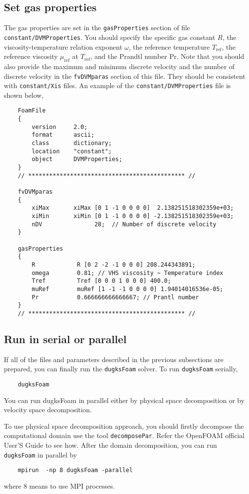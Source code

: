 \subsection{Set gas properties}
The gas properties are set in the \verb|gasProperties| section of file \verb|constant/DVMProperties|.
You should specify the specific gas constant $R$, the viscosity-temperature relation exponent $\omega$,
the reference temperature $T_\text{ref}$, the reference viscosity  $\mu_\text{ref}$ at $T_\text{ref}$,
and the Prandtl number Pr.
Note that you should also provide the maximum and minimum discrete velocity and the number of
discrete velocity in the \verb|fvDVMparas| section of this file.
They should be consistent with \verb|constant/Xis| files.
An example of the \verb|constant/DVMProperties| file is shown below,
\begin{verbatim}
    FoamFile
    {
        version     2.0;
        format      ascii;
        class       dictionary;
        location    "constant";
        object      DVMProperties;
    }
    // ********************************************* //

    fvDVMparas
    {
        xiMax       xiMax [0 1 -1 0 0 0 0]  2.138251518302359e+03;
        xiMin       xiMin [0 1 -1 0 0 0 0] -2.138251518302359e+03;
        nDV               28;  // Number of discrete velocity
    }

    gasProperties
    {
        R            R [0 2 -2 -1 0 0 0] 208.244343891;
        omega        0.81; // VHS viscosity ~ Temperature index
        Tref         Tref [0 0 0 1 0 0 0] 400.0;
        muRef        muRef [1 -1 -1 0 0 0 0] 1.94014016536e-05;
        Pr           0.666666666666667; // Prantl number
    }
    // ********************************************* //
\end{verbatim}

\subsection{Run in serial or parallel}
If all of the files and parameters described in the previous subsections are prepared, you can finally run the \verb|dugksFoam| solver.
To run \verb|dugksFoam| serially,
\begin{verbatim}
    dugksFoam
\end{verbatim}
You can run dugksFoam in parallel either by physical space decomposition or by velocity space decomposition.

To use physical space decomposition approach,  you should firstly decompose the computational domain use the tool \verb|decomposePar|.
Refer the OpenFOAM official User'S Guide to see how.
After the domain decomposition, you can run \verb|dugksFoam| in parallel by
\begin{verbatim}
    mpirun  -np 8 dugksFoam -parallel
\end{verbatim}
where 8 means to use MPI processes.

